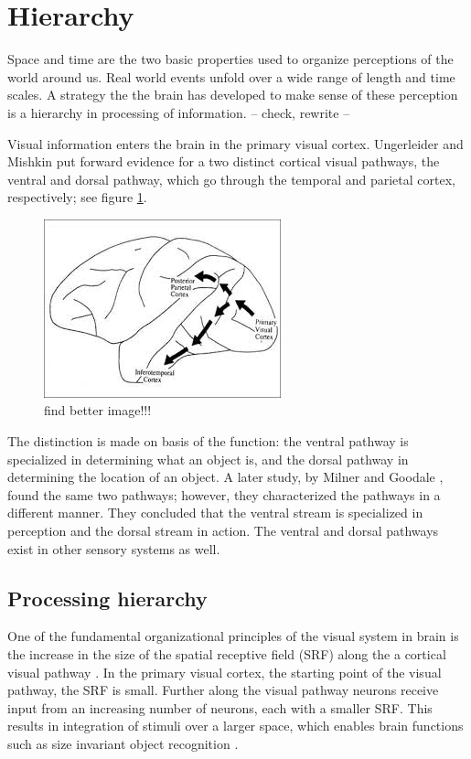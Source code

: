 \section{Hierarchy}
Space and time are the two basic properties used to organize perceptions of the world around us. Real world events unfold over a wide range of length and time scales. A strategy the the brain has developed to make sense of these perception is a hierarchy in processing of information. -- check, rewrite --

Visual information enters the brain in the primary visual cortex.
Ungerleider and Mishkin \cite{mishkin1983object} put forward evidence for a two distinct cortical visual pathways, the ventral and dorsal pathway, which go through the temporal and parietal cortex, respectively; see figure \ref{fig:visualpathways}. 
\begin{figure}[!ht]
\includegraphics[scale=1]{hierarchy_figures/visualpathways}
\caption{find better image!!!}
\label{fig:visualpathways}
\end{figure}
The distinction is made on basis of the function: the ventral pathway is specialized in determining what an object is, and the dorsal pathway in determining the location of an object.
A later study, by  Milner and Goodale \cite{milner2008two, goodale1992separate}, found the same two pathways; however, they characterized the pathways in a different manner. They concluded that the ventral stream is specialized in perception and the dorsal stream in action.
The ventral and dorsal pathways exist in other sensory systems as well.

\subsection{Processing hierarchy}

One of the fundamental organizational principles of the visual system in brain is the increase in the size of the spatial receptive field (SRF) along the a cortical visual pathway \cite{hubel1988eye,hubel1962receptive,lerner2001hierarchical}.
In the primary visual cortex,  the starting point of the visual pathway, the SRF is small.
Further along the visual pathway neurons receive input from an increasing number of neurons, each with a smaller SRF. This results in integration of stimuli over a larger space, which enables brain functions such as size invariant object recognition \cite{kobatake1994neuronal}.

